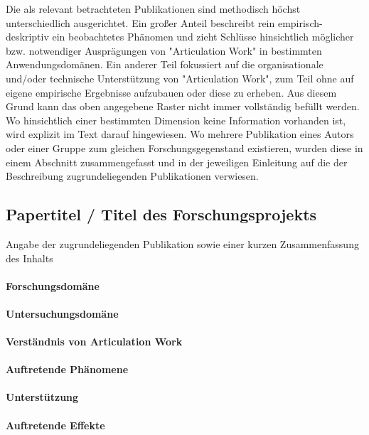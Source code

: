 Die als relevant betrachteten Publikationen sind methodisch höchst unterschiedlich ausgerichtet. Ein großer Anteil beschreibt rein empirisch-deskriptiv ein beobachtetes Phänomen und zieht Schlüsse hinsichtlich möglicher bzw. notwendiger Ausprägungen von "Articulation Work" in bestimmten Anwendungsdomänen. Ein anderer Teil fokussiert auf die organisationale und/oder technische Unterstützung von "Articulation Work", zum Teil ohne auf eigene empirische Ergebnisse aufzubauen oder diese zu erheben. Aus diesem Grund kann das oben angegebene Raster nicht immer vollständig befüllt werden. Wo hinsichtlich einer bestimmten Dimension keine Information vorhanden ist, wird explizit im Text darauf hingewiesen. Wo mehrere Publikation eines Autors oder einer Gruppe zum gleichen Forschungsgegenstand existieren, wurden diese in einem Abschnitt zusammengefasst und in der jeweiligen Einleitung auf die der Beschreibung zugrundeliegenden Publikationen verwiesen.

\subsection{Papertitel / Titel des Forschungsprojekts}

Angabe der zugrundeliegenden Publikation sowie einer kurzen Zusammenfassung des Inhalts

\paragraph{Forschungsdomäne}

\paragraph{Untersuchungsdomäne}

\paragraph{Verständnis von Articulation Work}

\paragraph{Auftretende Phänomene}

\paragraph{Unterstützung}

\paragraph{Auftretende Effekte}

